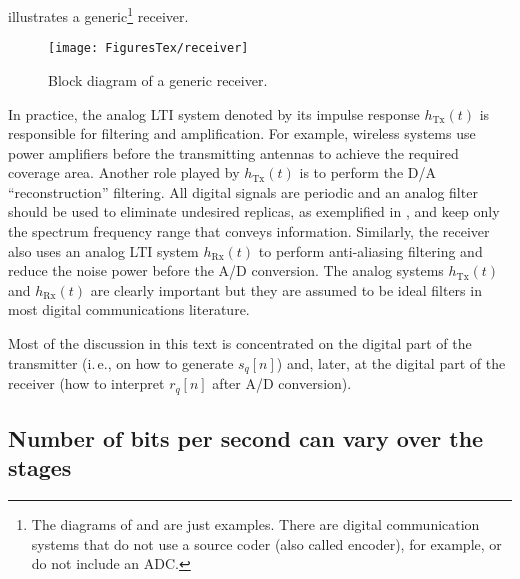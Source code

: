 illustrates a generic\footnote{The diagrams of  and  are just  examples. There are digital communication systems that do not use a source coder (also called encoder), for example, or do not include an ADC.} 	receiver.

\begin{figure}[htbp]
	\centering
		\texttt{[image: FiguresTex/receiver]}		
	\caption{Block diagram of a generic receiver.\label{fig:receiver}}
\end{figure}

In practice, the analog LTI system denoted by its impulse response $h_{\textrm{Tx}}(t)$ is responsible for filtering and amplification. For example, wireless systems use power amplifiers before the transmitting antennas to achieve the required coverage area. Another role played by $h_{\textrm{Tx}}(t)$ is to perform the D/A ``reconstruction'' filtering. All digital signals are periodic and an analog filter should be used to eliminate undesired replicas, as exemplified in , and keep only the spectrum frequency range that conveys information. Similarly, the receiver also uses an analog LTI system $h_\textrm{Rx}(t)$ to perform anti-aliasing filtering and reduce the noise power before the A/D conversion. The analog systems $h_\textrm{Tx}(t)$ and $h_\textrm{Rx}(t)$ are clearly important but they are assumed to be ideal filters in most digital communications literature.

Most of the discussion in this text is concentrated on the digital part of the transmitter (i.\,e., on how to generate $s_q[n]$) and, later, at the digital part of the receiver (how to interpret $r_q[n]$ after A/D conversion).


\subsection{Number of bits per second can vary over the stages}

